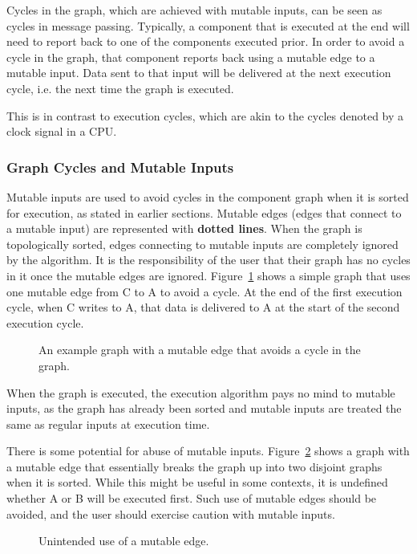 \documentclass[12pt]{article}
\begin{document}
Cycles in the graph, which are achieved with mutable inputs, can be seen as cycles in message passing. Typically, a component that is executed at the end will need to report back to one of the components executed prior. In order to avoid a cycle in the graph, that component reports back using a mutable edge to a mutable input. Data sent to that input will be delivered at the next execution cycle, {i.e.} the next time the graph is executed.

This is in contrast to execution cycles, which are akin to the cycles denoted by a clock signal in a CPU.
\subsubsection{Graph Cycles and Mutable Inputs}
\label{sec:mutable}
Mutable inputs are used to avoid cycles in the component graph when it is sorted for execution, as stated in earlier sections. Mutable edges (edges that connect to a mutable input) are represented with \textbf{dotted lines}. When the graph is topologically sorted, edges connecting to mutable inputs are completely ignored by the algorithm. It is the responsibility of the user that their graph has no cycles in it once the mutable edges are ignored. Figure~\ref{examplemutable} shows a simple graph that uses one mutable edge from C to A to avoid a cycle. At the end of the first execution cycle, when C writes to A, that data is delivered to A at the start of the second execution cycle.
\begin{figure}[h]
\centering
{}
\caption{An example graph with a mutable edge that avoids a cycle in the graph.}
\label{examplemutable}
\end{figure}

When the graph is executed, the execution algorithm pays no mind to mutable inputs, as the graph has already been sorted and mutable inputs are treated the same as regular inputs at execution time.

There is some potential for abuse of mutable inputs. Figure~\ref{mutableabuse} shows a graph with a mutable edge that essentially breaks the graph up into two disjoint graphs when it is sorted. While this might be useful in some contexts, it is undefined whether A or B will be executed first. Such use of mutable edges should be avoided, and the user should exercise caution with mutable inputs.

\begin{figure}[h]
\centering
{}
\caption{Unintended use of a mutable edge.}
\label{mutableabuse}
\end{figure}
\end{document}
